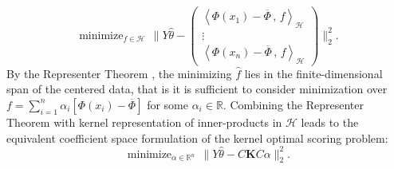 \documentclass[twoside, onecolumn]{article}
\def\Hcal{\mathcal{H}}
\def\Hcal{\mathcal{H}}
\def\Score{\widehat{\theta}}
\DeclareMathOperator*{\minimize}{minimize}
\newtheorem{remark}{Remark}
\begin{document}
\begin{equation*}
\minimize_{ f\in \mathcal{H}}\,\bigg\|Y\widehat\theta -\begin{pmatrix}
\left<\Phi(x_1)-\overline{\Phi}\,,\, f\right>_{\mathcal{H}}\\
\vdots\\
\left<\Phi(x_n)-\overline{\Phi}\,,\, f\right>_{\mathcal{H}}
\end{pmatrix}\bigg\|_{2}^{2}.
\end{equation*}
By the Representer Theorem \cite{kimeldorf_correspondence_1970}, the minimizing $\widehat f$ lies in the finite-dimensional span of the centered data, that is it is sufficient to consider minimization over $f=\sum_{i=1}^{n}\alpha_{i}[\Phi(x_i)-\overline{\Phi}]$ for some $\alpha_{i}\in \mathbb{R}$. Combining the Representer Theorem with kernel representation of inner-products in $\Hcal$
leads to the equivalent coefficient space formulation of the kernel optimal scoring problem:
\begin{equation}\label{eq:UnRegKernOptScore}
\minimize_{\alpha\in \mathbb{R}^{n}}\,\|Y\widehat \theta-C\mathbf{K}C\alpha\|_{2}^{2}.
\end{equation}



\end{document}

